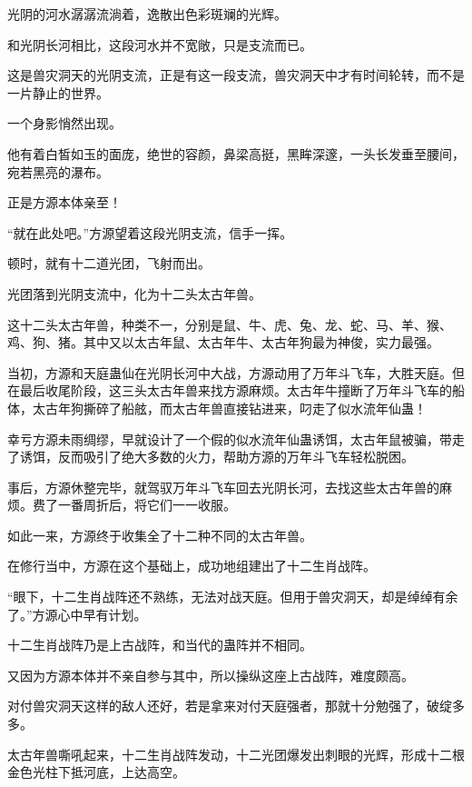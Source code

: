 
\begin{this_body}



光阴的河水潺潺流淌着，逸散出色彩斑斓的光辉。

和光阴长河相比，这段河水并不宽敞，只是支流而已。

这是兽灾洞天的光阴支流，正是有这一段支流，兽灾洞天中才有时间轮转，而不是一片静止的世界。

一个身影悄然出现。

他有着白皙如玉的面庞，绝世的容颜，鼻梁高挺，黑眸深邃，一头长发垂至腰间，宛若黑亮的瀑布。

正是方源本体亲至！

“就在此处吧。”方源望着这段光阴支流，信手一挥。

顿时，就有十二道光团，飞射而出。

光团落到光阴支流中，化为十二头太古年兽。

这十二头太古年兽，种类不一，分别是鼠、牛、虎、兔、龙、蛇、马、羊、猴、鸡、狗、猪。其中又以太古年鼠、太古年牛、太古年狗最为神俊，实力最强。

当初，方源和天庭蛊仙在光阴长河中大战，方源动用了万年斗飞车，大胜天庭。但在最后收尾阶段，这三头太古年兽来找方源麻烦。太古年牛撞断了万年斗飞车的船体，太古年狗撕碎了船舷，而太古年兽直接钻进来，叼走了似水流年仙蛊！

幸亏方源未雨绸缪，早就设计了一个假的似水流年仙蛊诱饵，太古年鼠被骗，带走了诱饵，反而吸引了绝大多数的火力，帮助方源的万年斗飞车轻松脱困。

事后，方源休整完毕，就驾驭万年斗飞车回去光阴长河，去找这些太古年兽的麻烦。费了一番周折后，将它们一一收服。

如此一来，方源终于收集全了十二种不同的太古年兽。

在修行当中，方源在这个基础上，成功地组建出了十二生肖战阵。

“眼下，十二生肖战阵还不熟练，无法对战天庭。但用于兽灾洞天，却是绰绰有余了。”方源心中早有计划。

十二生肖战阵乃是上古战阵，和当代的蛊阵并不相同。

又因为方源本体并不亲自参与其中，所以操纵这座上古战阵，难度颇高。

对付兽灾洞天这样的敌人还好，若是拿来对付天庭强者，那就十分勉强了，破绽多多。

太古年兽嘶吼起来，十二生肖战阵发动，十二光团爆发出刺眼的光辉，形成十二根金色光柱下抵河底，上达高空。


\end{this_body}
